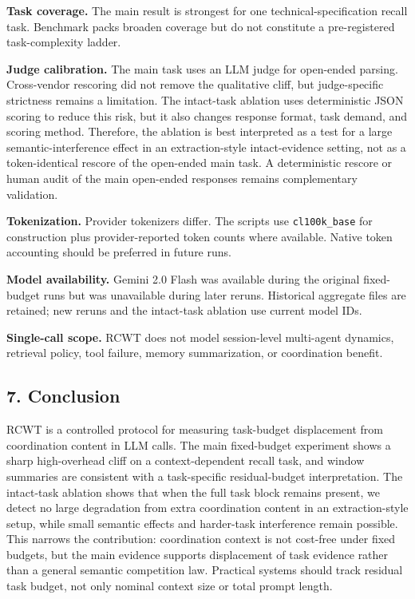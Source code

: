\documentclass[
  runningheads]{llncs}
\begin{document}
\textbf{Task coverage.} The main result is strongest for one
technical-specification recall task. Benchmark packs broaden coverage
but do not constitute a pre-registered task-complexity ladder.

\textbf{Judge calibration.} The main task uses an LLM judge for
open-ended parsing. Cross-vendor rescoring did not remove the
qualitative cliff, but judge-specific strictness remains a limitation.
The intact-task ablation uses deterministic JSON scoring to reduce this
risk, but it also changes response format, task demand, and scoring
method. Therefore, the ablation is best interpreted as a test for a
large semantic-interference effect in an extraction-style
intact-evidence setting, not as a token-identical rescore of the
open-ended main task. A deterministic rescore or human audit of the main
open-ended responses remains complementary validation.

\textbf{Tokenization.} Provider tokenizers differ. The scripts use
\texttt{cl100k\_base} for construction plus provider-reported token
counts where available. Native token accounting should be preferred in
future runs.

\textbf{Model availability.} Gemini 2.0 Flash was available during the
original fixed-budget runs but was unavailable during later reruns.
Historical aggregate files are retained; new reruns and the intact-task
ablation use current model IDs.

\textbf{Single-call scope.} RCWT does not model session-level
multi-agent dynamics, retrieval policy, tool failure, memory
summarization, or coordination benefit.

\subsection{7. Conclusion}\label{conclusion}

RCWT is a controlled protocol for measuring task-budget displacement
from coordination content in LLM calls. The main fixed-budget experiment
shows a sharp high-overhead cliff on a context-dependent recall task,
and window summaries are consistent with a task-specific residual-budget
interpretation. The intact-task ablation shows that when the full task
block remains present, we detect no large degradation from extra
coordination content in an extraction-style setup, while small semantic
effects and harder-task interference remain possible. This narrows the
contribution: coordination context is not cost-free under fixed budgets,
but the main evidence supports displacement of task evidence rather than
a general semantic competition law. Practical systems should track
residual task budget, not only nominal context size or total prompt
length.
\end{document}
